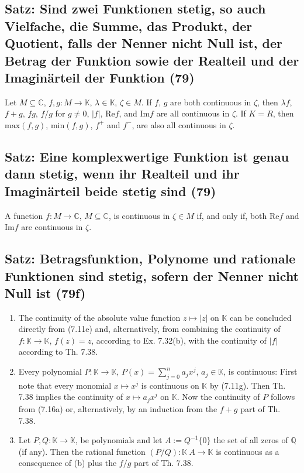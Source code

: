 \subsection{Satz: Sind zwei Funktionen stetig, so auch Vielfache, die Summe, das Produkt, der Quotient, falls der Nenner nicht Null ist, der Betrag der Funktion sowie der Realteil und der Imaginärteil der Funktion (79)}

Let $M \subseteq \mathbb { C }$,  $f,g : M \rightarrow \mathbb { K }$, $\lambda \in \mathbb { K }$, $\zeta \in M$. If $f$, $g$ are both continuous in $\zeta$, then $\lambda f$, $f + g$, $fg$, $f/g$ for $g \neq 0$, $|f|$, $\text{Re} f$, and $\text{Im} f$ are all continuous in $\zeta$. If $K = R$, then $\text{max} (f,g)$, $\text{min} (f,g)$, $f^{+}$ and $f^{-}$, are also all continuous in $\zeta$.

\subsection{Satz: Eine komplexwertige Funktion ist genau dann stetig, wenn ihr Realteil und ihr Imaginärteil beide stetig sind (79)}

A function $f : M \rightarrow \mathbb { C }$, $M \subseteq \mathbb { C }$, is continuous in $\zeta \in M$ if, and only if, both $\text{Re} f$ and $\text{Im} f$ are continuous in $\zeta$.

\subsection{Satz: Betragsfunktion, Polynome und rationale Funktionen sind stetig, sofern der Nenner nicht Null ist (79f)}

\begin{enumerate}[label=(\alph*)]
\item The continuity of the absolute value function $z \mapsto | z |$ on $\mathbb{K}$ can be concluded directly from (7.11e) and, alternatively, from combining the continuity of $f : \mathbb{K} \rightarrow \mathbb{K}$, $f(z) = z$, according to Ex. 7.32(b), with the continuity of $|f|$ according to Th. 7.38.
\item Every polynomial $P : \mathbb{K} \rightarrow \mathbb{K}$, $P(x) = \sum _ { j = 0} ^ { n } a _ { j } x ^ { j }$, $a_j \in \mathbb{K}$, is continuous: First note that every monomial $x \mapsto x^j$ is continuous on $\mathbb{K}$ by (7.11g). Then Th. 7.38 implies the continuity of $x \mapsto a_j x^j$ on $\mathbb{K}$. Now the continuity of $P$ follows from (7.16a) or, alternatively, by an induction from the $f + g$ part of Th. 7.38.
\item Let $P,Q : \mathbb{K} \rightarrow \mathbb{K}$, be polynomials and let $A := Q^{-1} \{ 0 \}$ the set of all zeros of $\mathbb{Q}$ (if any). Then the rational function $(P/Q) : \mathbb{K} \ A \rightarrow \mathbb{K}$ is continuous as a consequence of (b) plus the $f/g$ part of Th. 7.38.
\end{enumerate}


